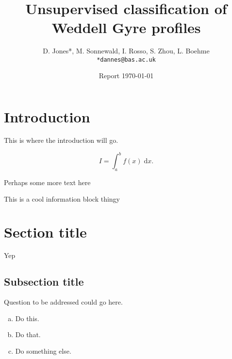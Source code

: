 \documentclass{article}
\title{Unsupervised classification of Weddell Gyre profiles} %
\author{D. Jones*, M. Sonnewald, I. Rosso, S. Zhou, L. Boehme\\ \texttt{*dannes@bas.ac.uk}} %
\date{Report \today} %
\begin{document}
\maketitle %


\section*{Introduction} %

This is where the introduction will go. 

\begin{equation}
	I = \int_{a}^{b} f(x) \; \text{d}x.
\end{equation}

Perhaps some more text here 

\begin{info} %
This is a cool information block thingy
\end{info}


\section{Section title} %

Yep


\subsection{Subsection title}

\begin{question}
Question to be addressed could go here. 

	\begin{enumerate}[(a)]
		\item Do this.
		\item Do that.
		\item Do something else.
	\end{enumerate}
\end{question}
	
\end{document}
